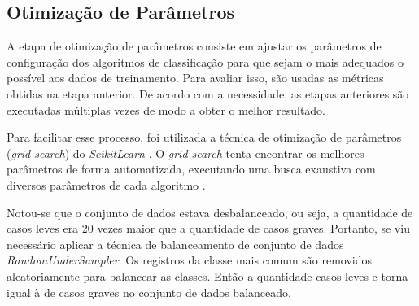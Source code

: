 \subsection{Otimização de Parâmetros}
\label{subsec:otimizacao}

A etapa de otimização de parâmetros consiste em ajustar os parâmetros de configuração dos algoritmos de classificação para que sejam o mais adequados o possível aos dados de treinamento. Para avaliar isso, são usadas as métricas obtidas na etapa anterior. De acordo com a necessidade, as etapas anteriores são executadas múltiplas vezes de modo a obter o melhor resultado.

Para facilitar esse processo, foi utilizada a técnica de otimização de parâmetros (\textit{grid search}) do \textit{ScikitLearn} \cite{sklearn}. O \textit{grid search} tenta encontrar os melhores parâmetros de forma automatizada, executando uma busca exaustiva com diversos parâmetros de cada algoritmo \cite{gridsearch}.

Notou-se que o conjunto de dados estava desbalanceado, ou seja, a quantidade de casos leves era 20 vezes maior que a quantidade de casos graves. Portanto, se viu necessário aplicar a técnica de balanceamento de conjunto de dados \textit{RandomUnderSampler}. Os registros da classe mais comum são removidos aleatoriamente para balancear as classes. Então a quantidade casos leves e torna igual à de casos graves no conjunto de dados balanceado.
